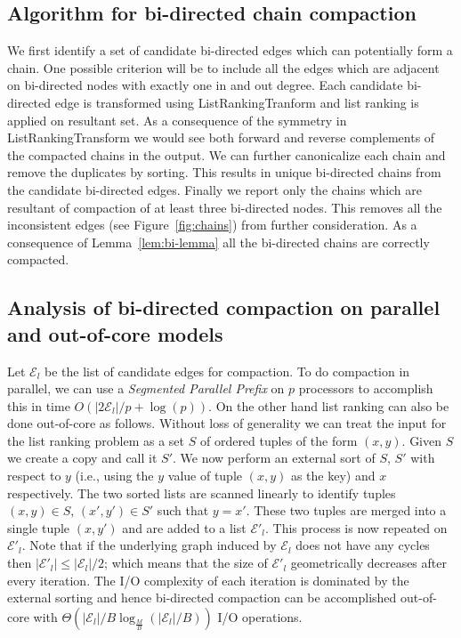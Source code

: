 \documentclass[11pt,conference,twocolumn]{IEEEtran}
\begin{document}
\subsection{Algorithm for bi-directed chain compaction}
We first identify a set of candidate bi-directed edges which can potentially form a chain. One possible
criterion will be to include all the edges which are adjacent on bi-directed nodes with exactly one in
and out degree. Each candidate bi-directed edge is transformed using {\sf ListRankingTranform} and 
{\sf list ranking} is applied on resultant set. As a consequence of the symmetry in {\sf ListRankingTransform}
we would see both forward and reverse complements of the compacted chains in the output. We can further
canonicalize each chain and remove the duplicates by sorting. This results in unique bi-directed chains
from the candidate bi-directed edges. Finally we report only the chains which are resultant of compaction
of at least three bi-directed nodes. This removes all the inconsistent edges (see Figure~\ref{fig:chains})
from further consideration. As a consequence of Lemma~\ref{lem:bi-lemma} all the bi-directed chains are
correctly compacted.
\subsection{Analysis of bi-directed compaction on parallel and out-of-core models}
Let $\mathcal{E}_l$ be the list of candidate edges for compaction. To do compaction in parallel, we can use 
a {\em Segmented Parallel Prefix} on $p$ processors to accomplish this in time $O(|2\mathcal{E}_l|/p +\log(p))$. 
On the other hand list ranking can also be done out-of-core as follows. Without loss of generality we can
treat the input for the list ranking problem as a set $S$ of ordered tuples of the form $(x,y)$. Given $S$
we create a copy and call it $S'$. We now perform an external sort of $S$, $S'$ with respect to $y$ (i.e., using
the $y$ value of tuple $(x,y)$ as the key) and $x$ respectively. The two sorted lists are scanned linearly to
identify tuples $(x, y)\in S$, $(x', y')\in S'$ such that $y=x'$. These two tuples are merged into a single
tuple $(x,y')$ and are added to a list $\mathcal{E}'_l$. This process is  now repeated on $\mathcal{E}'_l$.
Note that if the underlying graph induced by $\mathcal{E}_l$ does not have any cycles then 
$|\mathcal{E}'_l| \leq |\mathcal{E}_l|/2$; which means that the size of $\mathcal{E}'_l$ geometrically
decreases after every iteration. The I/O complexity of each iteration is dominated by the external sorting and hence bi-directed compaction can be accomplished out-of-core with $\Theta(|\mathcal{E}_l|/B\log_{\frac{M}{B}}(|\mathcal{E}_l|/B))$ I/O operations.
\end{document}
